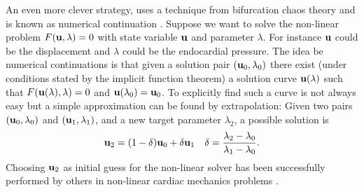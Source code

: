 An even more clever strategy, uses a technique from bifurcation
chaos theory and is known as numerical continuation
\cite{allgower2003introduction}.  Suppose we want to
solve the non-linear problem $F(\mathbf{u}, \lambda)=0$ with state variable
$\mathbf{u}$ and parameter $\lambda$. For instance $\mathbf{u}$ could be the
displacement and $\lambda$ could be the endocardial pressure.
The idea be numerical continuations is that given a solution pair
$(\mathbf{u}_0, \lambda_0)$ there exist (under conditions stated by the
implicit function theorem) a solution curve $\mathbf{u}(\lambda)$ such that
$F(\mathbf{u}(\lambda), \lambda)=0$ and $\mathbf{u}(\lambda_0) = \mathbf{u}_0$.
To explicitly find such a curve is not always easy but a simple
approximation can be found by extrapolation: Given two pairs
$(\mathbf{u}_0, \lambda_0)$ and $(\mathbf{u}_1, \lambda_1)$, and a new target
parameter $\lambda_2$, a possible solution is 
\begin{align}
  \mathbf{u}_2 =  (1-\delta)\mathbf{u}_0 + \delta \mathbf{u}_1 && \delta = \frac{\lambda_2 - \lambda_0}{\lambda_1 - \lambda_0}.
\end{align}
Choosing $\mathbf{u}_2$ as initial guess for the non-linear solver has been
successfully performed by others in non-linear cardiac mechanics
problems \cite{pezzuto2013mechanics}. 





